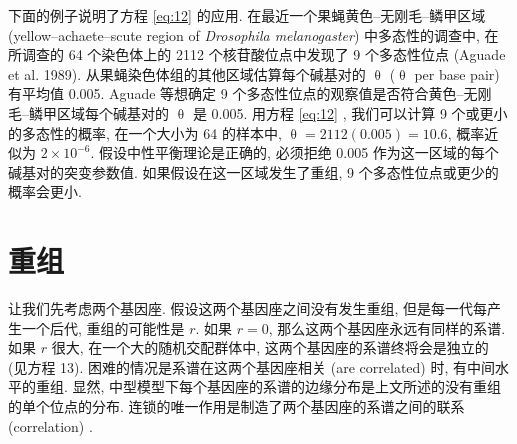 \documentclass[12pt]{article}
\begin{document}
下面的例子说明了方程 \ref{eq:12} 的应用. 在最近一个果蝇黄色--无刚毛--鳞甲区域 (yellow--achaete--scute region of
\textit{Drosophila melanogaster}) 中多态性的调查中, 在所调查的 64 个染色体上的 2112 个核苷酸位点中发现了 9
个多态性位点 (Aguade et al. 1989). 从果蝇染色体组的其他区域估算每个碱基对的 $\uptheta$ ($\uptheta$ per base
pair) 有平均值 0.005. Aguade 等想确定 9 个多态性位点的观察值是否符合黄色--无刚毛--鳞甲区域每个碱基对的 $\uptheta$
是 0.005. 用方程 \ref{eq:12} , 我们可以计算 9 个或更小的多态性的概率, 在一个大小为 64 的样本中, $\uptheta =
2112(0.005) = 10.6$, 概率近似为 $2 \times 10^{-6}$. 假设中性平衡理论是正确的, 必须拒绝 0.005
作为这一区域的每个碱基对的突变参数值. 如果假设在这一区域发生了重组, 9 个多态性位点或更少的概率会更小.

\section{重组}

让我们先考虑两个基因座. 假设这两个基因座之间没有发生重组, 但是每一代每产生一个后代, 重组的可能性是 $r$. 如果 $r=0$,
那么这两个基因座永远有同样的系谱. 如果 $r$ 很大, 在一个大的随机交配群体中, 这两个基因座的系谱终将会是独立的 (见方程 13).
困难的情况是系谱在这两个基因座相关 (are correlated) 时, 有中间水平的重组. 显然,
中型模型下每个基因座的系谱的边缘分布是上文所述的没有重组的单个位点的分布. 连锁的唯一作用是制造了两个基因座的系谱之间的联系
(correlation) .
\end{document}
